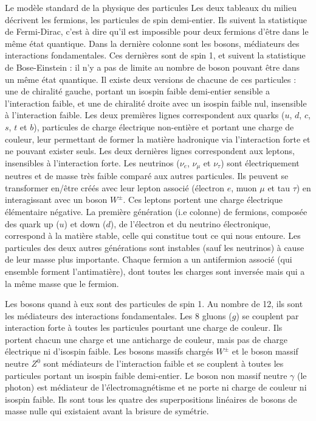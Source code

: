 \begin{figure*}[htpb!]
\begin{activitybox}[label=box::SM]{Le modèle standard de la physique des particules}
          Les deux tableaux du milieu décrivent les fermions, les particules de spin demi-entier. Ils suivent la statistique de Fermi-Dirac, c'est à dire qu'il est impossible pour deux fermions d'être dans le même état quantique. Dans la dernière colonne sont les bosons, médiateurs des interactions fondamentales. Ces dernières sont de spin 1, et suivent la statistique de Bose-Einstein : il n'y a pas de limite au nombre de boson pouvant être dans un même état quantique. Il existe deux versions de chacune de ces particules : une de chiralité gauche, portant un isospin faible demi-entier sensible a l'interaction faible, et une de chiralité droite avec un isospin faible nul, insensible à l'interaction faible. Les deux premières lignes correspondent aux quarks ($u$, $d$, $c$, $s$, $t$ et $b$), particules de charge électrique non-entière et portant une charge de couleur, leur permettant de former la matière hadronique via l'interaction forte et ne pouvant exister seuls. Les deux dernières lignes correspondent aux leptons, insensibles à l'interaction forte. Les neutrinos  ($\nu_e$, $\nu_{\mu}$ et $\nu_{\tau}$) sont électriquement neutres et de masse très faible comparé aux autres particules. Ils peuvent se transformer en/être créés avec leur lepton associé (électron $e$, muon $\mu$ et tau $\tau$) en interagissant avec un boson $W^{\pm}$. Ces leptons portent une charge électrique élémentaire négative. La première génération (i.e colonne) de fermions, composée des quark up ($u$) et down ($d$), de l'électron et du neutrino électronique, correspond à la matière stable, celle qui constitue tout ce qui nous entoure. Les particules des deux autres générations sont instables (sauf les neutrinos) à cause de leur masse plus importante. Chaque fermion a un antifermion associé (qui ensemble forment l'antimatière), dont toutes les charges sont inversée mais qui a la même masse que le fermion.
        
          Les bosons quand à eux sont des particules de spin 1. Au nombre de 12, ils sont les médiateurs des interactions fondamentales. Les 8 gluons ($g$) se couplent par interaction forte à toutes les particules pourtant une charge de couleur. Ils portent chacun une charge et une anticharge de couleur, mais pas de charge électrique ni d'isospin faible. Les bosons massifs chargés $W^{\pm}$ et le boson massif neutre $Z^0$ sont médiateurs de l'interaction faible et se couplent à toutes les particules portant un isospin faible demi-entier. Le boson non massif neutre $\gamma$ (le photon) est médiateur de l'électromagnétisme et ne porte ni charge de couleur ni isospin faible. Ils sont tous les quatre des superpositions linéaires de bosons de masse nulle qui existaient avant la brisure de symétrie.
        \end{activitybox}
      \end{figure*}


